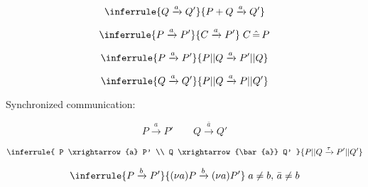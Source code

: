 {{$$\inferrule
{ Q \xrightarrow{a} Q' }
{ P+Q \xrightarrow{a} Q' }
$$

$$\inferrule
{ P \xrightarrow{a} P' }
{ C \xrightarrow{a} P' }
\; C\,\hat{=}\,P
$$

$$\inferrule
{ P \xrightarrow{a} P' }
{ P || Q \xrightarrow{a} P' || Q }
$$

$$\inferrule
{ Q \xrightarrow{a} Q' }
{ P || Q \xrightarrow{a} P || Q' }
$$

Synchronized communication:

$$ P \xrightarrow{a} P' \qquad Q \xrightarrow{\bar{a}} Q' $$

$$\inferrule
{ P \xrightarrow{a} P' \\ Q \xrightarrow{\bar{a}} Q' }
{ P || Q \xrightarrow{\tau} P' || Q' }
$$

$$\inferrule
{ P \xrightarrow{b} P' }
{ (\nu a) P \xrightarrow{b} (\nu a) P' }
\; a \neq b,\, \bar{a} \neq b
$$

}} %
